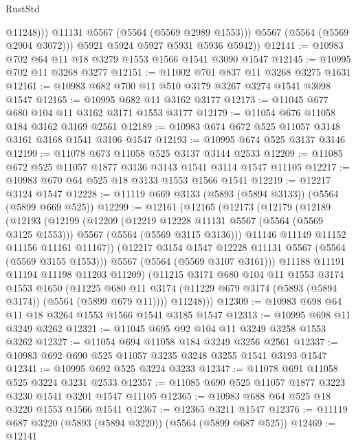 \begin{lexlean}{RustStd}
\begin{coremodule}
                  @11248)))
            @11131
            @5567
            (@5564 (@5569 @2989 @1553)))
          @5567
          (@5564 (@5569 @2904 @3072)))
        @5921
        @5924
        @5927
        @5931
        @5936
        @5942))
@12141 := @10983 @702 @64 @11 @18 @3279 @1553 @1566 @1541 @3090 @1547
@12145 := @10995 @702 @11 @3268 @3277
@12151 := @11002 @701 @837 @11 @3268 @3275 @1631
@12161 := @10983 @682 @700 @11 @510 @3179 @3267 @3274 @1541 @3098 @1547
@12165 := @10995 @682 @11 @3162 @3177
@12173 := @11045 @677 @680 @104 @11 @3162 @3171 @1553 @3177
@12179 := @11054 @676 @11058 @184 @3162 @3169 @2561
@12189 := @10983 @674 @672 @525 @11057 @3148 @3161 @3168 @1541 @3106 @1547
@12193 := @10995 @674 @525 @3137 @3146
@12199 := @11078 @673 @11058 @525 @3137 @3144 @2533
@12209 := @11085 @672 @525 @11057 @1877 @3136 @3143 @1541 @3114 @1547 @11105
@12217 := @10983 @670 @64 @525 @18 @3133 @1553 @1566 @1541
@12219 := @12217 @3124 @1547
@12228 := @11119 @669 @3133 (@5893 (@5894 @3133)) (@5564 (@5899 @669 @525))
@12299 := @12161
    (@12165
      (@12173
        (@12179
          (@12189
            (@12193
              (@12199
                (@12209
                  (@12219 @12228 @11131 @5567 (@5564 (@5569 @3125 @1553)))
                  @5567
                  (@5564 (@5569 @3115 @3136)))
                @11146
                @11149
                @11152
                @11156
                @11161
                @11167))
            (@12217 @3154 @1547 @12228 @11131 @5567 (@5564 (@5569 @3155 @1553)))
            @5567
            (@5564 (@5569 @3107 @3161)))
          @11188
          @11191
          @11194
          @11198
          @11203
          @11209)
        (@11215
          @3171
          @680
          @104
          @11
          @1553
          @3174
          @1553
          @1650
          (@11225 @680 @11 @3174 (@11229 @679 @3174 (@5893 (@5894 @3174)) (@5564 (@5899 @679 @11))))
          @11248)))
@12309 := @10983 @698 @64 @11 @18 @3264 @1553 @1566 @1541 @3185 @1547
@12313 := @10995 @698 @11 @3249 @3262
@12321 := @11045 @695 @92 @104 @11 @3249 @3258 @1553 @3262
@12327 := @11054 @694 @11058 @184 @3249 @3256 @2561
@12337 := @10983 @692 @690 @525 @11057 @3235 @3248 @3255 @1541 @3193 @1547
@12341 := @10995 @692 @525 @3224 @3233
@12347 := @11078 @691 @11058 @525 @3224 @3231 @2533
@12357 := @11085 @690 @525 @11057 @1877 @3223 @3230 @1541 @3201 @1547 @11105
@12365 := @10983 @688 @64 @525 @18 @3220 @1553 @1566 @1541
@12367 := @12365 @3211 @1547
@12376 := @11119 @687 @3220 (@5893 (@5894 @3220)) (@5564 (@5899 @687 @525))
@12469 := @12141

\end{coremodule}
\end{lexlean}
